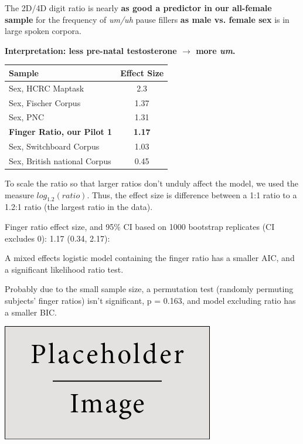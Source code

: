\documentclass[a0,portrait]{a0poster}
\begin{document}
\begin{multicols}{2}
The 2D/4D digit ratio is nearly \textbf{as good a predictor in our all-female sample} for the frequency of \textsl{um/uh} pause fillers  \textbf{as male vs. female sex} is in large spoken corpora.
\begin{center}
\noindent\textbf{Interpretation: less pre-natal testosterone $\rightarrow$ more \textsl{um}.}
\end{center}
\begin{table} %
\begin{tabular}{l c}
\toprule
\textbf{Sample} & \textbf{Effect Size}\\
\midrule
Sex, HCRC Maptask & 2.3\\
Sex, Fischer Corpus & 1.37\\
Sex, PNC & 1.31\\
\textbf{Finger Ratio, our Pilot 1} & \textbf{1.17}\\
Sex, Switchboard Corpus & 1.03\\
Sex, British national Corpus & 0.45\\
\bottomrule
\end{tabular}
\end{table}

To scale the ratio so that larger ratios don't unduly affect the model, we used the measure $log_1.2(ratio)$. Thus, the effect size is difference between a 1:1 ratio to a 1.2:1 ratio (the largest ratio in the data).

Finger ratio effect size, and 95\% CI based on 1000 bootstrap replicates (CI excludes 0): 1.17 (0.34, 2.17):

A mixed effects logistic model containing the finger ratio has a smaller AIC, and a significant likelihood ratio test.

Probably due to the small sample size, a permutation test (randomly permuting subjects' finger ratios) isn't significant, p = 0.163, and model excluding ratio has a smaller BIC.


\begin{center}\vspace{1cm}
\includegraphics[width=0.8\linewidth]{placeholder}
\end{center}\vspace{1cm}



\end{multicols}
\end{document}
